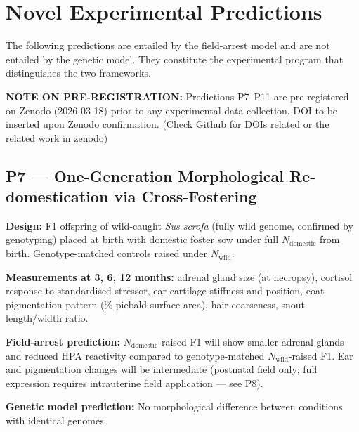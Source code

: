 \documentclass[11pt, a4paper]{article}
\begin{document}
\section{Novel Experimental Predictions}
\label{sec:predictions}

The following predictions are entailed by the
field-arrest model and are not entailed by the genetic
model. They constitute the experimental program that
distinguishes the two frameworks.

\begin{mdframed}[
  backgroundcolor=predbox,
  linecolor=blue!50!black,
  linewidth=0.8pt,
  innertopmargin=0.5em,
  innerbottommargin=0.5em,
  innerleftmargin=0.8em,
  innerrightmargin=0.8em
]
\textbf{NOTE ON PRE-REGISTRATION:}
Predictions P7--P11 are pre-registered on Zenodo
(2026-03-18) prior to any experimental data collection.
DOI to be inserted upon Zenodo confirmation. (Check Github for DOIs related or the related work in zenodo)
\end{mdframed}

\vspace{0.3em}

\subsection{P7 --- One-Generation Morphological
Re-domestication via Cross-Fostering}

\textbf{Design:} F1 offspring of wild-caught
\textit{Sus scrofa} (fully wild genome, confirmed
by genotyping) placed at birth with domestic foster
sow under full $N_{\text{domestic}}$ from birth.
Genotype-matched controls raised under $N_{\text{wild}}$.

\textbf{Measurements at 3, 6, 12 months:}
adrenal gland size (at necropsy), cortisol response
to standardised stressor, ear cartilage stiffness
and position, coat pigmentation pattern
(\% piebald surface area), hair coarseness,
snout length/width ratio.

\textbf{Field-arrest prediction:}
$N_{\text{domestic}}$-raised F1 will show smaller
adrenal glands and reduced HPA reactivity compared
to genotype-matched $N_{\text{wild}}$-raised F1.
Ear and pigmentation changes will be intermediate
(postnatal field only; full expression requires
intrauterine field application --- see P8).

\textbf{Genetic model prediction:}
No morphological difference between conditions
with identical genomes.
\end{document}
